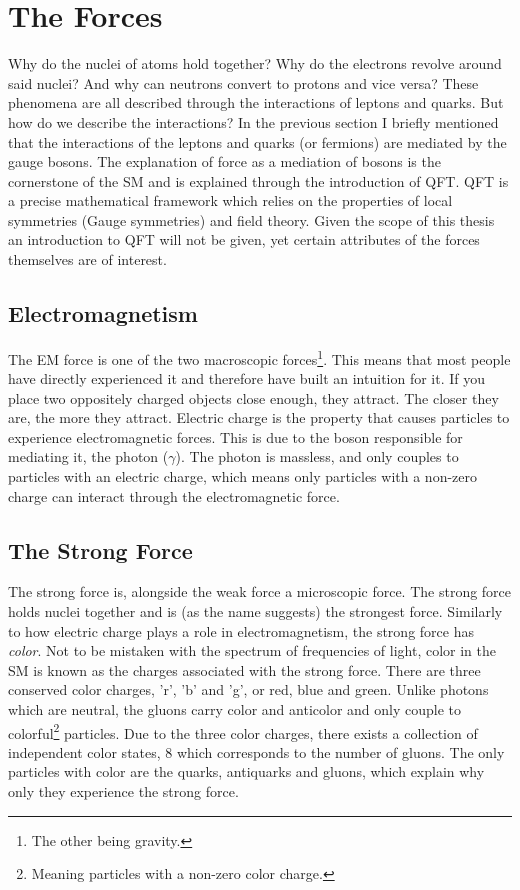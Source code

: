 \section{The Forces}
Why do the nuclei of atoms hold together? Why do the electrons revolve
around said nuclei? And why can neutrons convert to protons and vice versa? These phenomena 
are all described through the interactions of leptons and quarks. But how do we describe the 
interactions? In the previous section I briefly mentioned that the interactions of the leptons 
and quarks (or fermions) are mediated by the gauge bosons. The explanation of force as 
a mediation of bosons is the cornerstone of the \ac{SM} and is explained through 
the introduction of \ac{QFT}. \ac{QFT} is a precise mathematical framework which relies on the 
properties of local symmetries (Gauge symmetries) and field theory. Given the scope of this thesis
an introduction to \ac{QFT} will not be given, yet certain attributes of the forces themselves
are of interest. 
\subsection{Electromagnetism}
The \acf{EM} force is one of the two macroscopic forces\footnote{The other being gravity.}.
This means that most people have directly experienced it and therefore have built an intuition for
it. If you place two oppositely charged objects close enough, they attract. The closer they are, 
the more they attract. Electric charge is the property that causes particles to 
experience electromagnetic forces. This is due to the boson responsible for mediating it, 
the photon ($\gamma$). The photon is massless, and only couples to particles with an electric charge,
which means only particles with a non-zero charge can interact through the electromagnetic force.
\subsection{The Strong Force}
The strong force is, alongside the weak force a microscopic force. The strong force 
holds nuclei together and is (as the name suggests) the strongest force. Similarly to how electric 
charge plays a role in electromagnetism, the strong force has \emph{color}. Not to be mistaken 
with the spectrum of frequencies of light, color in the \ac{SM} is known as the charges 
associated with the strong force. There are three conserved color charges, 'r', 'b' and 'g', or red, blue and green. 
Unlike photons which are neutral, the gluons carry color and anticolor and only couple to 
colorful\footnote{Meaning particles with a non-zero color charge.} particles. 
Due to the three color charges, there exists a collection of independent color states, 8 which 
corresponds to the number of gluons. The only particles with color are the quarks, antiquarks and gluons, which explain why 
only they experience the strong force. 
